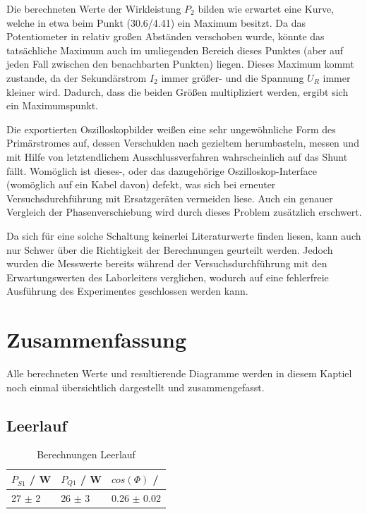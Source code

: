 \documentclass[12pt,a4paper,twoside]{article}
\begin{document}
Die berechneten Werte der Wirkleistung $P_{2}$ bilden wie erwartet eine Kurve, welche in etwa beim Punkt (30.6/4.41) ein Maximum besitzt. Da das Potentiometer in relativ großen Abständen verschoben wurde, könnte das tatsächliche Maximum auch im umliegenden Bereich dieses Punktes (aber auf jeden Fall zwischen den benachbarten Punkten) liegen.
Dieses Maximum kommt zustande, da der Sekundärstrom $I_{2}$ immer größer- und die Spannung $U_{R}$ immer kleiner wird. Dadurch, dass die beiden Größen multipliziert werden, ergibt sich ein Maximumspunkt. \newline

\noindent
Die exportierten Oszilloskopbilder weißen eine sehr ungewöhnliche Form des Primärstromes auf, dessen Verschulden nach gezieltem herumbasteln, messen und mit Hilfe von letztendlichem Ausschlussverfahren wahrscheinlich auf das Shunt fällt. Womöglich ist dieses-, oder das dazugehörige Oszilloskop-Interface (womöglich auf ein Kabel davon) defekt, was sich bei erneuter Versuchsdurchführung mit Ersatzgeräten vermeiden liese. Auch ein genauer Vergleich der Phasenverschiebung wird durch dieses Problem zusätzlich erschwert. \newline

\noindent
Da sich für eine solche Schaltung keinerlei Literaturwerte finden liesen, kann auch nur Schwer über die Richtigkeit der Berechnungen geurteilt werden. Jedoch wurden die Messwerte bereits während der Versuchsdurchführung mit den Erwartungswerten des Laborleiters verglichen, wodurch auf eine fehlerfreie Ausführung des Experimentes geschlossen werden kann.

\section{Zusammenfassung} %

Alle berechneten Werte und resultierende Diagramme werden in diesem Kaptiel noch einmal übersichtlich dargestellt und zusammengefasst. 

\subsection{Leerlauf}

\begin{table}[H]
    \centering
    \caption{Berechnungen Leerlauf}
    \label{tab:BerechnungenLeerlaufAW}
    \begin{tabular}{| l | l | l |}
        \hline
        $P_{S1}$ / W & $P_{Q1}$ / W & $cos(\Phi)$ / \\
        \hline
        27 $\pm$ 2 & 26 $\pm$ 3 & 0.26 $\pm$ 0.02 \\
        \hline
    \end{tabular}
\end{table}
\end{document}
